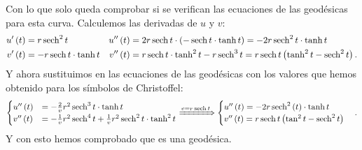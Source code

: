 Con lo que solo queda comprobar si se verifican las ecuaciones de las geodésicas
para esta curva. Calculemos las derivadas de $u$ y $v$:
\begin{align*}
    u'\left( t \right) &= r \operatorname{sech}^2 t & u''\left( t \right) &= 2 r
    \operatorname{sech} t \cdot \left( - \operatorname{sech} t \cdot \tanh t \right) = -2 r \operatorname{sech}^2 t \cdot
    \tanh t\\
    v'\left( t \right) &= -r \operatorname{sech} t \cdot \tanh t & v''\left( t \right) &= r
    \operatorname{sech} t \cdot \tanh^2 t - r \operatorname{sech}^3 t = r\operatorname{sech} t \left( \tanh^2 t - \operatorname{sech}^2
    t \right).
\end{align*}
Y ahora sustituimos en las ecuaciones de las geodésicas con los valores que
hemos obtenido para los símbolos de Christoffel:
\[
\begin{cases}
    u''\left( t \right) &= -\frac{2}{v}r^2 \operatorname{sech}^3 t \cdot \tanh t\\
    v''\left( t \right) &= -\frac{1}{v} r^2 \operatorname{sech}^4 t + \frac{1}{v} r^2 \operatorname{sech}^2 t
    \cdot \tanh^2 t
\end{cases} \xRightarrow{v = r \operatorname{sech}t} \begin{cases}
    u''\left( t \right) = -2 r \operatorname{sech}^2 \left( t \right) \cdot \tanh t\\
    v''\left( t \right) = r \operatorname{sech} t \left( \tan^2 t - \operatorname{sech}^2 t \right)
\end{cases}.
\]
Y con esto hemos comprobado que es una geodésica.
